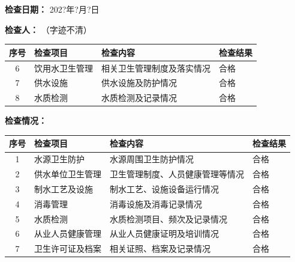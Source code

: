 \documentclass[UTF8,10pt,a4paper,fontset=fandol]{ctexart}
\newcommand{\fieldvalue}[1]{#1}
\newcommand{\handwritten}[1]{#1}
\begin{document}
\hfill
\textbf{检查日期：}
\fieldvalue{\handwritten{202?年?月?日}}

\hfill
\textbf{检查人：}
\fieldvalue{\handwritten{（字迹不清）}}

\vspace{0.5em}

\begin{tabularx}{\textwidth}{|c|X|X|X|}
\hline
序号 & 检查项目 & 检查内容 & 检查结果 \\
\hline
6 &
饮用水卫生管理 &
相关卫生管理制度及落实情况 &
\fieldvalue{\handwritten{合格}}
\\
\hline
7 &
供水设施 &
供水设施及防护情况 &
\fieldvalue{\handwritten{合格}}
\\
\hline
8 &
水质检测 &
水质检测及记录情况 &
\fieldvalue{\handwritten{合格}}
\\
\hline
\end{tabularx}

\vspace{0.5em}

\noindent
\textbf{检查情况：}

\begin{tabularx}{\textwidth}{|c|X|X|X|}
\hline
序号 & 检查项目 & 检查内容 & 检查结果 \\
\hline
1 &
水源卫生防护 &
水源周围卫生防护情况 &
\fieldvalue{\handwritten{合格}}
\\
\hline
2 &
供水单位卫生管理 &
卫生管理制度、人员健康管理等情况 &
\fieldvalue{\handwritten{合格}}
\\
\hline
3 &
制水工艺及设施 &
制水工艺、设施设备运行情况 &
\fieldvalue{\handwritten{合格}}
\\
\hline
4 &
消毒管理 &
消毒设施及消毒记录情况 &
\fieldvalue{\handwritten{合格}}
\\
\hline
5 &
水质检测 &
水质检测项目、频次及记录情况 &
\fieldvalue{\handwritten{合格}}
\\
\hline
6 &
从业人员健康管理 &
从业人员健康证明及培训情况 &
\fieldvalue{\handwritten{合格}}
\\
\hline
7 &
卫生许可证及档案 &
相关证照、档案及记录情况 &
\fieldvalue{\handwritten{合格}}
\\
\hline
\end{tabularx}
\end{document}
